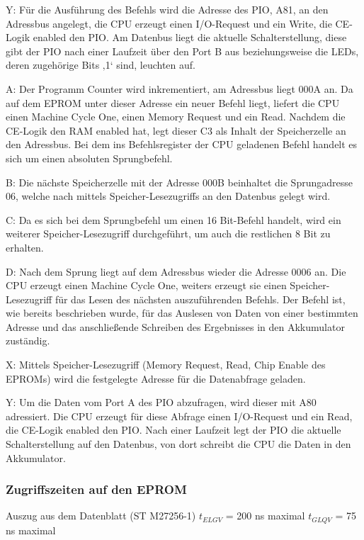 Y: Für die Ausführung des Befehls wird die Adresse des PIO, A81, an den Adressbus angelegt, die CPU erzeugt einen I/O-Request und ein Write, die CE-Logik enabled den PIO. Am Datenbus liegt die aktuelle Schalterstellung, diese gibt der PIO nach einer Laufzeit über den Port B aus beziehungsweise die LEDs, deren zugehörige Bits ‚1‘ sind, leuchten auf.

A: Der Programm Counter wird inkrementiert, am Adressbus liegt 000A an. Da auf dem EPROM unter dieser Adresse ein neuer Befehl liegt, liefert die CPU einen Machine Cycle One, einen Memory Request und ein Read. Nachdem die CE-Logik den RAM enabled hat, legt dieser C3 als Inhalt der Speicherzelle an den Adressbus. Bei dem ins Befehlsregister der CPU geladenen Befehl handelt es sich um einen absoluten Sprungbefehl.

B: Die nächste Speicherzelle mit der Adresse 000B beinhaltet die Sprungadresse 06, welche nach mittels Speicher-Lesezugriffs an den Datenbus gelegt wird.

C: Da es sich bei dem Sprungbefehl um einen 16 Bit-Befehl handelt, wird ein weiterer Speicher-Lesezugriff durchgeführt, um auch die restlichen 8 Bit zu erhalten.

D: Nach dem Sprung liegt auf dem Adressbus wieder die Adresse 0006 an. Die CPU erzeugt einen Machine Cycle One, weiters erzeugt sie einen Speicher-Lesezugriff für das Lesen des nächsten auszuführenden Befehls. Der Befehl ist, wie bereits beschrieben wurde, für das Auslesen von Daten von einer bestimmten Adresse und das anschließende Schreiben des Ergebnisses in den Akkumulator zuständig.

X: Mittels Speicher-Lesezugriff (Memory Request, Read, Chip Enable des EPROMs) wird die festgelegte Adresse für die Datenabfrage geladen.

Y: Um die Daten vom Port A des PIO abzufragen, wird dieser mit A80 adressiert. Die CPU erzeugt für diese Abfrage einen I/O-Request und ein Read, die CE-Logik enabled den PIO. Nach einer Laufzeit legt der PIO die aktuelle Schalterstellung auf den Datenbus, von dort schreibt die CPU die Daten in den Akkumulator.

\subsubsection{Zugriffszeiten auf den EPROM}
Auszug aus dem Datenblatt (ST M27256-1)
$t_{ELGV}$ = 200 ns maximal
$t_{GLQV}$ = 75 ns maximal

